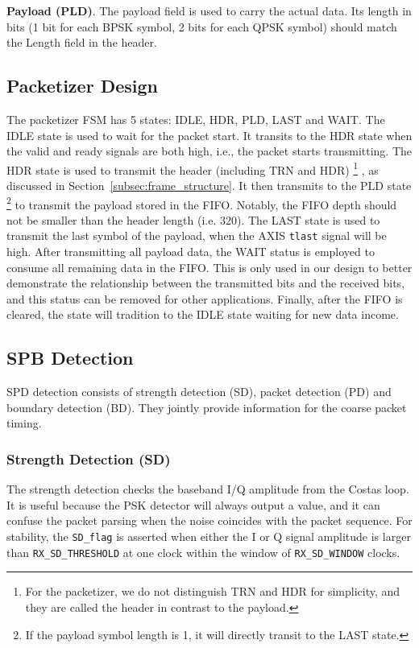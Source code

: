 \documentclass[journal,twoside]{IEEEtran}
\begin{document}
    \textbf{Payload (PLD)}.
    The payload field is used to carry the actual data.
    Its length in bits (1 bit for each BPSK symbol, 2 bits for each QPSK symbol) should match the Length field in the header.

    \subsection{Packetizer Design}

      The packetizer FSM has 5 states: IDLE, HDR, PLD, LAST and WAIT.
      The IDLE state is used to wait for the packet start.
      It transits to the HDR state when the valid and ready signals are both high,
      i.e., the packet starts transmitting.
      The HDR state is used to transmit the header (including TRN and HDR)%
      \footnote{For the packetizer, we do not distinguish TRN and HDR for simplicity,
      and they are called the header in contrast to the payload.}%
      , as discussed in Section~\ref{subsec:frame_structure}.
      It then transmits to the PLD state%
      \footnote{If the payload symbol length is 1, it will directly transit to the LAST state.}
      to transmit the payload stored in the FIFO.
      Notably, the FIFO depth should not be smaller than the header length (i.e. $320$).
      The LAST state is used to transmit the last symbol of the payload,
      when the AXIS \texttt{tlast} signal will be high.
      After transmitting all payload data,
      the WAIT status is employed to consume all remaining data in the FIFO.
      This is only used in our design to better demonstrate the relationship between the transmitted bits and the received bits,
      and this status can be removed for other applications.
      Finally, after the FIFO is cleared, the state will tradition to the IDLE state waiting for new data income.

    \subsection{SPB Detection}

      SPD detection consists of strength detection (SD),
      packet detection (PD) and boundary detection (BD).
      They jointly provide information for the coarse packet timing.

      \subsubsection{Strength Detection (SD)}
      The strength detection checks the baseband I/Q amplitude from the Costas loop.
      It is useful because the PSK detector will always output a value,
      and it can confuse the packet parsing when the noise coincides with the packet sequence.
      For stability, the \texttt{SD\_flag} is asserted when
      either the I or Q signal amplitude is larger than \texttt{RX\_SD\_THRESHOLD}
      at one clock within the window of \texttt{RX\_SD\_WINDOW} clocks.
\end{document}
